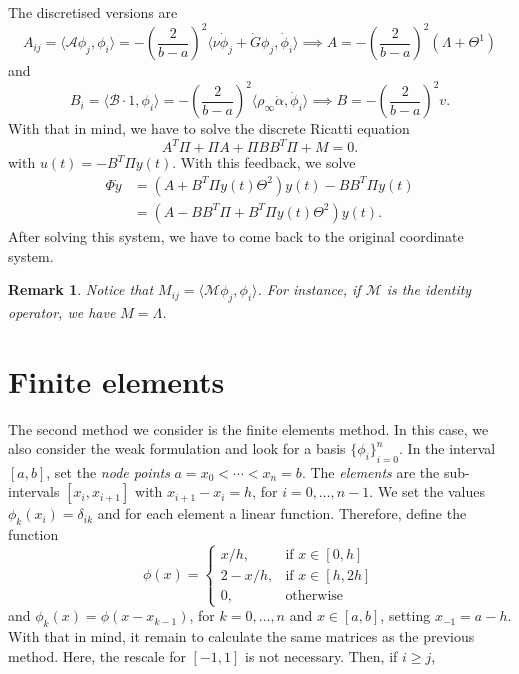 \documentclass[12pt]{article}
\newcommand{\A}{\mathcal{A}}
\newcommand{\B}{\mathcal{B}}
\newcommand{\steady}{\rho_{\infty}}
\newcommand{\inner}[2]{\langle{} #1, #2 \rangle{}}
\newtheorem{remark}{Remark}[subsection]
\theoremstyle{definition}
\begin{document}
The discretised versions are 
\[
A_{ij} = \inner{\A \phi_j}{\phi_i} = -{\left(\frac{2}{b-a}\right)}^2\inner{\nu \dot \phi_j + \dot G \phi_j}{\dot \phi_i} \implies A = -{\left(\frac{2}{b-a}\right)}^2(\Lambda + \Theta^1)
\]
and 
\[
B_{i} = \inner{\B\cdot 1}{\phi_i} = -{\left(\frac{2}{b-a}\right)}^2\inner{\steady \dot\alpha}{\dot\phi_i} \implies B = -{\left(\frac{2}{b-a}\right)}^2 v.
\]
With that in mind, we have to solve the discrete Ricatti equation
\[
A^T\Pi + \Pi A + \Pi B B^T \Pi + M = 0.
\]
with $u(t) = -B^T\Pi y(t)$. 
With this feedback, we solve
\[
\begin{split}
    \Phi \dot{y} &= (A + B^T\Pi y(t) \Theta^2 )y(t) - BB^T\Pi y(t) \\ 
    &= (A - BB^T\Pi  + B^T\Pi y(t) \Theta^2)y(t).
\end{split}
\]
After solving this system, we have to come back to the original coordinate system.

\begin{remark}
    Notice that $M_{ij} = \inner{\mathcal{M} \phi_j}{\phi_i}$.
    For instance, if $\mathcal{M}$ is the identity operator, we have $M = \Lambda$.
\end{remark}

\section{Finite elements}

The second method we consider is the finite elements method. 
In this case, we also consider the weak formulation and look for a basis ${\{\phi_i\}}_{i=0}^{n}$.
In the interval $[a,b]$, set the {\em node points\/} $a = x_0 < \cdots < x_n = b$.
The {\em elements\/} are the sub-intervals $[x_i, x_{i+1}]$ with $x_{i+1}-x_i=h$, for $i=0, \dots, n-1$.
We set the values $\phi_k(x_i) = \delta_{ik}$ and for each element a linear function. 
Therefore, define the function
\[
\phi(x) = \begin{cases}
    x/h, &\text{if } x \in[0,h] \\
    2 - x/h, &\text{if } x \in [h,2h] \\
    0, &\text{otherwise}
\end{cases} 
\]
and $\phi_{k}(x) = \phi(x-x_{k-1})$, for $k=0, \dots, n$ and $x \in [a,b]$, setting $x_{-1} = a-h$.
With that in mind, it remain to calculate the same matrices as the previous method.
Here, the rescale for $[-1,1]$ is not necessary.
Then, if $i \ge j$,
\end{document}
